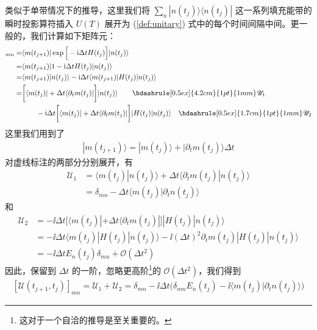 类似于单带情况下的推导，这里我们将 $\sum_n|n(t_j)\rangle\langle n(t_j)|$ 这一系列填充能带的瞬时投影算符插入 $U(T)$ 展开为  (\ref{def:unitary}) 式中的每个时间间隔中间。更一般的，我们计算如下矩阵元：
\begin{align}
[\mathscr{U}(t_{j+1},t_j)]_{mn}=&\langle m(t_{j+1})|\exp\Big[-\ii\Delta tH(t_j)\Big]|n(t_j)\rangle\\
=& \langle m(t_{j+1})|1-\ii\Delta tH(t_j)|n(t_j)\rangle\\
=& \langle m(t_{j+1})|n(t_j)\rangle-\ii\Delta t\langle m(t_{j+1})|H(t_j)|n(t_j)\rangle\\
=& \bigg[\langle m(t_j)|+\Delta t\langle\partial_tm(t_j)|\bigg]|n(t_j)\rangle\qquad 
\hdashrule[0.5ex]{4.2cm}{1pt}{1mm} \mathscr{U}_1\\
&\qquad-\ii\Delta t\bigg[\langle m(t_j)|+\Delta t\langle\partial_tm(t_j)|\bigg]|H(t_j)|n(t_j)\rangle \quad
\hdashrule[0.5ex]{1.7cm}{1pt}{1mm} \mathscr{U}_2
\end{align}
这里我们用到了
\begin{align}
|m(t_{j+1})\rangle=|m(t_j)\rangle+|\partial_tm(t_j)\rangle\Delta t
\end{align}
对虚线标注的两部分分别展开，有
\begin{align}
\mathscr{U}_1 &=\langle m(t_j)|n(t_j)\rangle+\Delta t\langle\partial_tm(t_j)|n(t_j)\rangle\\
&= \delta_{mn}-\Delta t\langle m(t_j)|\partial_tn(t_j)\rangle
\end{align}
和
\begin{align}
\mathscr{U}_2 &=-\ii\Delta t\bigg[\langle m(t_j)|+\Delta t\langle\partial_tm(t_j)|\bigg]|H(t_j)|n(t_j)\rangle\\
&= -\ii\Delta t\langle m(t_j)|H(t_j)|n(t_j)\rangle-\ii(\Delta t)^2\partial_tm(t_j)|H(t_j)|n(t_j)\rangle\\
&= -\ii\Delta tE_n(t_j)\delta_{mn}+\mathcal{O}(\Delta t^2)
\end{align}
因此，保留到 $\Delta t$ 的一阶，忽略更高阶\footnote{这对于一个自洽的推导是至关重要的。}的 $\mathcal{O}(\Delta t^2)$，我们得到
\begin{align}\label{eqn.umn}
[\mathscr{U}(t_{j+1},t_j)]_{mn}=\mathscr{U}_1+\mathscr{U}_2=\delta_{mn}-\ii\Delta t\bigg(\delta_{mn}E_{n}(t_j)-\ii\langle m(t_j)|\partial_tn(t_j)\rangle\bigg)
\end{align}

